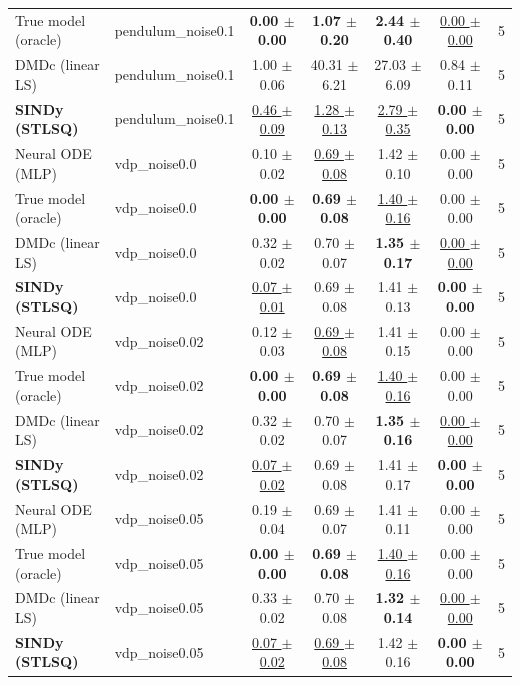 \begin{tabular}{llccccc}
True model (oracle) & pendulum\_noise0.1 & \textbf{0.00 $\pm$ 0.00} & \textbf{1.07 $\pm$ 0.20} & \textbf{2.44 $\pm$ 0.40} & \underline{0.00 $\pm$ 0.00} & 5 \\
DMDc (linear LS) & pendulum\_noise0.1 & 1.00 $\pm$ 0.06 & 40.31 $\pm$ 6.21 & 27.03 $\pm$ 6.09 & 0.84 $\pm$ 0.11 & 5 \\
\textbf{SINDy (STLSQ)} & pendulum\_noise0.1 & \underline{0.46 $\pm$ 0.09} & \underline{1.28 $\pm$ 0.13} & \underline{2.79 $\pm$ 0.35} & \textbf{0.00 $\pm$ 0.00} & 5 \\
\midrule
Neural ODE (MLP) & vdp\_noise0.0 & 0.10 $\pm$ 0.02 & \underline{0.69 $\pm$ 0.08} & 1.42 $\pm$ 0.10 & 0.00 $\pm$ 0.00 & 5 \\
True model (oracle) & vdp\_noise0.0 & \textbf{0.00 $\pm$ 0.00} & \textbf{0.69 $\pm$ 0.08} & \underline{1.40 $\pm$ 0.16} & 0.00 $\pm$ 0.00 & 5 \\
DMDc (linear LS) & vdp\_noise0.0 & 0.32 $\pm$ 0.02 & 0.70 $\pm$ 0.07 & \textbf{1.35 $\pm$ 0.17} & \underline{0.00 $\pm$ 0.00} & 5 \\
\textbf{SINDy (STLSQ)} & vdp\_noise0.0 & \underline{0.07 $\pm$ 0.01} & 0.69 $\pm$ 0.08 & 1.41 $\pm$ 0.13 & \textbf{0.00 $\pm$ 0.00} & 5 \\
\midrule
Neural ODE (MLP) & vdp\_noise0.02 & 0.12 $\pm$ 0.03 & \underline{0.69 $\pm$ 0.08} & 1.41 $\pm$ 0.15 & 0.00 $\pm$ 0.00 & 5 \\
True model (oracle) & vdp\_noise0.02 & \textbf{0.00 $\pm$ 0.00} & \textbf{0.69 $\pm$ 0.08} & \underline{1.40 $\pm$ 0.16} & 0.00 $\pm$ 0.00 & 5 \\
DMDc (linear LS) & vdp\_noise0.02 & 0.32 $\pm$ 0.02 & 0.70 $\pm$ 0.07 & \textbf{1.35 $\pm$ 0.16} & \underline{0.00 $\pm$ 0.00} & 5 \\
\textbf{SINDy (STLSQ)} & vdp\_noise0.02 & \underline{0.07 $\pm$ 0.02} & 0.69 $\pm$ 0.08 & 1.41 $\pm$ 0.17 & \textbf{0.00 $\pm$ 0.00} & 5 \\
\midrule
Neural ODE (MLP) & vdp\_noise0.05 & 0.19 $\pm$ 0.04 & 0.69 $\pm$ 0.07 & 1.41 $\pm$ 0.11 & 0.00 $\pm$ 0.00 & 5 \\
True model (oracle) & vdp\_noise0.05 & \textbf{0.00 $\pm$ 0.00} & \textbf{0.69 $\pm$ 0.08} & \underline{1.40 $\pm$ 0.16} & 0.00 $\pm$ 0.00 & 5 \\
DMDc (linear LS) & vdp\_noise0.05 & 0.33 $\pm$ 0.02 & 0.70 $\pm$ 0.08 & \textbf{1.32 $\pm$ 0.14} & \underline{0.00 $\pm$ 0.00} & 5 \\
\textbf{SINDy (STLSQ)} & vdp\_noise0.05 & \underline{0.07 $\pm$ 0.02} & \underline{0.69 $\pm$ 0.08} & 1.42 $\pm$ 0.16 & \textbf{0.00 $\pm$ 0.00} & 5 \\

\end{tabular}
